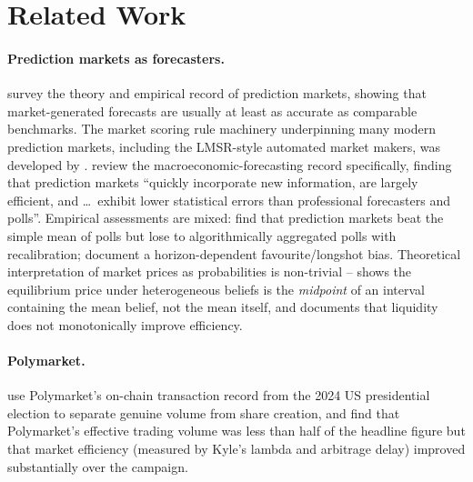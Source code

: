 \documentclass{article}
\begin{document}
\section{Related Work}

\paragraph{Prediction markets as forecasters.}
\citet{wolfers2004prediction} survey the theory and empirical record of
prediction markets, showing that market-generated forecasts are usually
at least as accurate as comparable benchmarks.  The market scoring rule
machinery underpinning many modern prediction markets, including the
LMSR-style automated market makers, was developed by
\citet{hanson2003combinatorial}.  \citet{snowberg2013prediction} review
the macroeconomic-forecasting record specifically, finding that
prediction markets ``quickly incorporate new information, are largely
efficient, and \dots\ exhibit lower statistical errors than
professional forecasters and polls''.  Empirical assessments are mixed:
\citet{atanasov2017distilling} find that prediction markets beat the
simple mean of polls but lose to algorithmically aggregated polls with
recalibration; \citet{page2013calibration} document a horizon-dependent
favourite/longshot bias.  Theoretical interpretation of market prices
as probabilities is non-trivial -- \citet{manski2006interpreting} shows
the equilibrium price under heterogeneous beliefs is the
\emph{midpoint} of an interval containing the mean belief, not the
mean itself, and \citet{tetlock2008liquidity} documents that liquidity
does not monotonically improve efficiency.

\paragraph{Polymarket.}
\citet{tsang2026polymarket} use Polymarket's on-chain transaction
record from the 2024 US presidential election to separate genuine
volume from share creation, and find that Polymarket's effective
trading volume was less than half of the headline figure but that
market efficiency (measured by Kyle's lambda and arbitrage delay)
improved substantially over the campaign.
\end{document}
